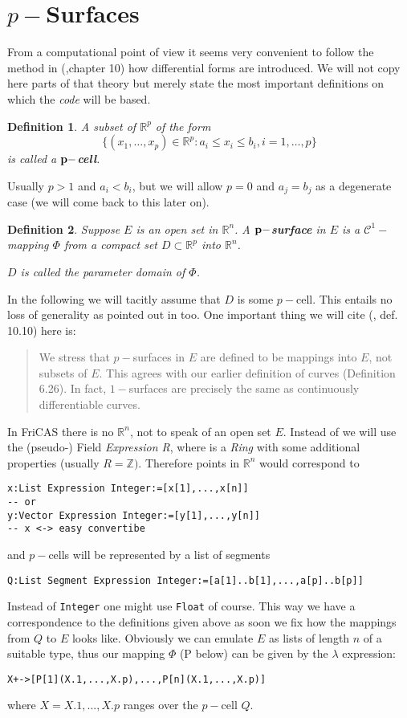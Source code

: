 \documentclass[12pt,a4paper]{article}
\newcommand{\RR}[1]{\mathbb{R}^{#1}}
\newtheorem{definition}{Definition}
\begin{document}
\section{$p-$Surfaces}
From a computational point of view it seems very convenient to follow
the method in (\cite{PMA},chapter 10) how differential forms are 
introduced. We will not copy here parts of that theory but merely
state the most important definitions on which the {\em code} will be
based.
%
\begin{definition}
A subset of ${\RR p}$ of the form
  \begin{displaymath}
    \{\left(x_1,\ldots,x_p\right)\in {\RR p}: 
       a_i \leq x_i \leq b_i, i=1,\ldots,p\}
  \end{displaymath} 
is called a $\bf p-${\bf cell}.
\end{definition}
%
Usually $p>1$ and $a_i<b_i$, but we will allow $p=0$ and $a_j=b_j$ as
a degenerate case (we will come back to this later on).
%
\begin{definition}
Suppose $E$ is an open set in $\RR n$. A $\bf p-${\bf surface} in $E$
is a $\mathcal{C}^1-$mapping $\Phi$ from a compact set $D\subset\RR p$
into $\RR n$.

$D$ is called the parameter domain of $\Phi$.
\end{definition}
%
In the following we will tacitly assume that $D$ is some $p-$cell. 
This entails no loss of generality as pointed out in \cite{PMA} too. 
One important thing we will cite (\cite{PMA}, def. 10.10) here is:
\begin{verse}
We stress that $p-$surfaces in $E$ are defined to be mappings into $E$, 
not subsets of $E$. This agrees with our earlier definition of curves 
(Definition 6.26). In fact, $1-$surfaces are precisely the same as 
continuously differentiable curves. 
\end{verse}
%
In FriCAS there is no $\RR n$, not to speak of an open set $E$. Instead
of we will use the (pseudo-) Field {\em Expression R}, where is a 
{\em Ring} with some additional properties (usually $R=\mathbb Z)$.
Therefore points in $\RR n$ would correspond to
\begin{lstlisting}
x:List Expression Integer:=[x[1],...,x[n]]
-- or
y:Vector Expression Integer:=[y[1],...,y[n]]
-- x <-> easy convertibe 
\end{lstlisting}
and $p-$cells will be represented by a list of segments
\begin{lstlisting}
Q:List Segment Expression Integer:=[a[1]..b[1],...,a[p]..b[p]] 
\end{lstlisting}
Instead of {\tt Integer} one might use {\tt Float} of course. This
way we have a correspondence to the definitions given above as soon we
fix how the mappings from $Q$ to $E$ looks like. Obviously we can
emulate $E$ as lists of length $n$ of a suitable type, thus our 
mapping $\Phi$ (P below) can be given by the $\lambda$ expression: 
\begin{lstlisting}
X+->[P[1](X.1,...,X.p),...,P[n](X.1,...,X.p)]
\end{lstlisting}
where $X=X.1,...,X.p$ ranges over the $p-$cell $Q$. 
\end{document}
